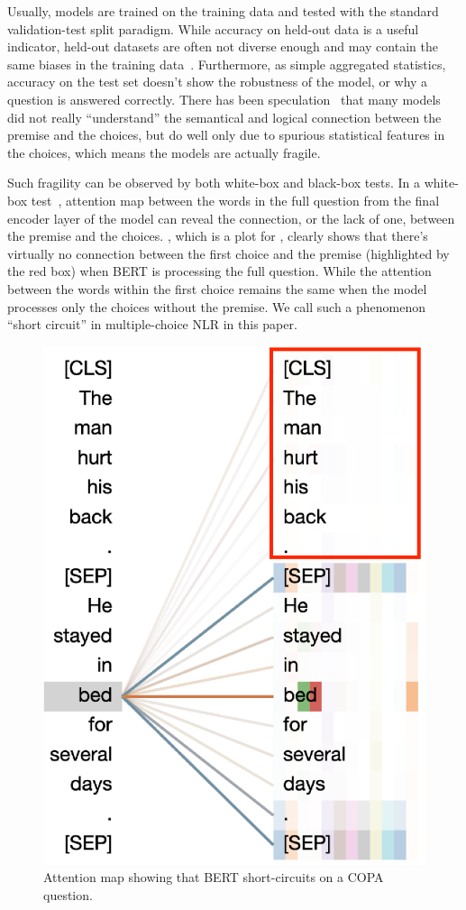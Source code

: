 Usually, models are trained on the training data and tested with the standard 
validation-test split paradigm.  While accuracy on held-out data is a useful
indicator, held-out datasets are often not diverse enough
and may contain the same biases in the training
data~\cite{mccoy2019right}. Furthermore, as simple aggregated statistics, 
accuracy on the test set doesn't show the robustness of the model,
or why a question is answered correctly. 
There has been speculation~\cite{endingonly1,zellers2018swag} that many models 
did not really ``understand'' the semantical and logical connection between
the premise and the choices, 
but do well only due to spurious statistical features in the choices, 
which means the models are actually fragile.

Such fragility can be observed by 
both white-box and 
black-box tests.
In a white-box test~\cite{vig-2019-multiscale}, attention map between the words in the full question 
from the final encoder layer of the model can reveal the
connection, or the lack of one, between the premise and the choices. 
, which is a plot for ,
clearly shows that there's virtually no connection between the first choice
and the premise (highlighted by the red box) when BERT is processing
the full question. While the attention between the words within the
first choice remains the same when the model processes only the choices
without the premise. 
We call such a phenomenon ``short circuit'' in multiple-choice 
NLR in this paper. 

\begin{figure}[th!]
\centering
\includegraphics[width=0.6\columnwidth]{figure/end_related.eps}
\caption{Attention map showing that BERT short-circuits on a COPA question.}
\label{fig:att-goodex}
\end{figure}

